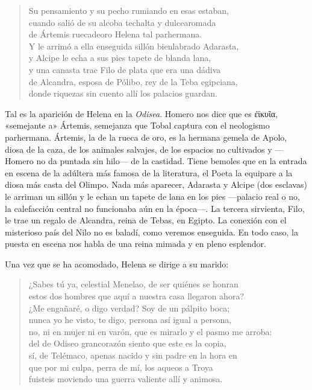 \documentclass[11pt,a4paper]{article}
\newcommand{\gr}[1]{\foreignlanguage{greek}{#1}}
\begin{document}
\begin{verse}
Su pensamiento y su pecho rumiando en esas estaban,\\
cuando salió de su alcoba techalta y dulcearomada\\
de Ártemis ruecadeoro Helena tal parhermana.\\
Y le arrimó a ella enseguida sillón bienlabrado Adarasta,\\
y Alcipe le echa a sus pies tapete de blanda lana,\\
y una canasta trae Filo de plata que era una dádiva\\
de Alcandra, esposa de Pólibo, rey de la Teba egipciana,\\
donde riquezas sin cuento allí los palacios guardan.
\end{verse}

Tal es la aparición de Helena en la \emph{Odisea}. Homero nos dice que es \gr{ἐϊκυῖα}, «semejante a» Ártemis, semejanza que Tobal captura con el neologismo parhermana. Ártemis, la de la rueca de oro, es la hermana gemela de Apolo, diosa de la caza, de los animales salvajes, de los espacios no cultivados y ---Homero no da puntada sin hilo--- de la castidad. Tiene bemoles que en la entrada en escena de la adúltera más famosa de la literatura, el Poeta la equipare a la diosa más casta del Olimpo. Nada más aparecer, Adarasta y Alcipe (dos esclavas) le arriman un sillón y le echan un tapete de lana en los pies ---palacio real o no, la calefacción central no funcionaba aún en la época---. La tercera sirvienta, Filo, le trae un regalo de Alcandra, reina de Tebas, en Egipto. La conexión con el misterioso país del Nilo no es baladí, como veremos enseguida. En todo caso, la puesta en escena nos habla de una reina mimada y en pleno esplendor.

Una vez que se ha acomodado, Helena se dirige a su marido:

\begin{verse}
¿Sabes tú ya, celestial Menelao, de ser quiénes se honran\\
estos dos hombres que aquí a nuestra casa llegaron ahora?\\
¿Me engañaré, o digo verdad? Soy de un pálpito boca;\\
nunca yo he visto, te digo, persona así igual a persona,\\
no, ni en mujer ni en varón, que es mirarlo y el pasmo me arroba:\\
del de Odiseo grancorazón siento que este es la copia,\\
sí, de Telémaco, apenas nacido y sin padre en la hora en\\
que por mi culpa, perra de mí, los aqueos a Troya\\
fuisteis moviendo una guerra valiente allí y animosa.
\end{verse}
\end{document}
